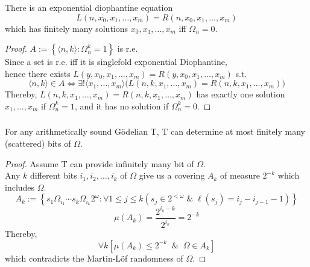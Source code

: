 \documentclass[UTF8,aspectratio=43,11pt,colorlinks,compress,openany]{beamer}%
\begin{document}
\begin{frame}\frametitle{}
	\begin{theorem}
		There is an exponential diophantine equation \[L(n,x_0,x_1,\ldots,x_m)=R(n,x_0,x_1,\ldots,x_m)\] which has finitely many solutions $x_0,x_1,\ldots,x_m$ iff $\Omega_n=0$.
	\end{theorem}
	\begin{proof}
		$A:=\left\{\langle n,k\rangle: \Omega^k_n=1\right\}$ is r.e.\\
		Since a set is r.e. iff it is singlefold exponential Diophantine,\\
		hence there exists $L(y,x_0,x_1,\ldots,x_m)=R(y,x_0,x_1,\ldots,x_m)$ s.t.
		\[\langle n,k\rangle\in A\iff \exists !\langle x_1,\ldots,x_m\rangle\big(L(n,k,x_1,\ldots,x_m)=R(n,k,x_1,\ldots,x_m)\big)\]
		Thereby, $L(n,k,x_1,\ldots,x_m)=R(n,k,x_1,\ldots,x_m)$ has exactly one solution $x_1,\ldots,x_m$ if $\Omega^k_n=1$, and it has no solution if $\Omega^k_n=0$.
	\end{proof}
\end{frame}

\begin{frame}\frametitle{}
	\begin{theorem}
		For any arithmetically sound G\"odelian $\mathrm{T}$, $\mathrm{T}$ can determine at most finitely many (scattered) bits of $\Omega$.
	\end{theorem}
	\begin{proof}
		Assume $\mathrm{T}$ can provide infinitely many bit of $\Omega$.\\
		Any $k$ different bits $i_1,i_2,\ldots,i_k$ of $\Omega$ give us a covering $A_k$ of measure $2^{-k}$ which includes $\Omega$.
		\[A_k:=\left\{s_1\Omega_{i_1}\cdots s_k\Omega_{i_k}2^\omega: \forall 1\leq j\leq k\left(s_j\in 2^{<\omega}\;\&\;\ell(s_j)=i_j-i_{j-1}-1\right)\right\}\]
		\[\mu(A_k)=\dfrac{2^{i_k-k}}{2^{i_k}}=2^{-k}\]
		Thereby, \[\forall k\left[\mu(A_k)\leq 2^{-k}\;\;\&\;\;\Omega\in A_k\right]\]
		which contradicts the Martin-L\"of randomness of $\Omega$.
	\end{proof}
\end{frame}
\end{document}
